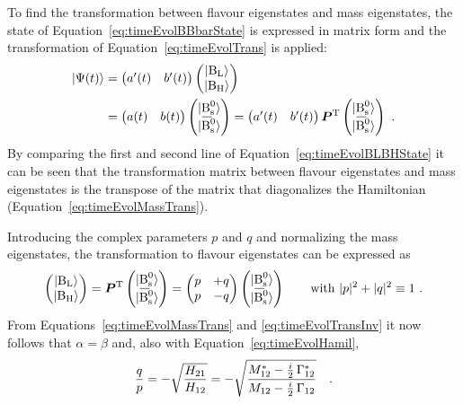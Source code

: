 To find the transformation between flavour eigenstates and mass eigenstates, the state of Equation~\ref{eq:timeEvolBBbarState} is expressed
in matrix form and the transformation of Equation~\ref{eq:timeEvolTrans} is applied:
\begin{equation}
  \label{eq:timeEvolBLBHState}
  \begin{split}
    |\Psi(t)\rangle &= \begin{pmatrix} a'(t) & b'(t) \end{pmatrix} \begin{pmatrix} \BLst \\ \BHst \end{pmatrix} \\
                    &= \begin{pmatrix} a(t) & b(t) \end{pmatrix} \begin{pmatrix} \Bsst \\ \Bsbarst \end{pmatrix}
                     = \begin{pmatrix} a'(t) & b'(t) \end{pmatrix} \vec{P}^\text{T} \begin{pmatrix} \Bsst \\ \Bsbarst \end{pmatrix}
    \ .
  \end{split}
\end{equation}
By comparing the first and second line of Equation~\ref{eq:timeEvolBLBHState} it can be seen that the transformation matrix between flavour
eigenstates and mass eigenstates is the transpose of the matrix that diagonalizes the Hamiltonian (Equation~\ref{eq:timeEvolMassTrans}).

Introducing the complex parameters $p$ and $q$ and normalizing the mass eigenstates, the transformation to flavour eigenstates can be
expressed as
\begin{equation}
  \label{eq:timeEvolTransInv}
  \begin{pmatrix} \BLst \\ \BHst \end{pmatrix}
    = \vec{P}^\text{T} \begin{pmatrix} \Bsst \\ \Bsbarst \end{pmatrix}
    = \begin{pmatrix} p & +q \\ p & -q \end{pmatrix}
      \begin{pmatrix} \Bsst \\ \Bsbarst \end{pmatrix}
  \qquad
  \text{with } |p|^2+|q|^2\equiv1
  \ .
\end{equation}
From Equations~\ref{eq:timeEvolMassTrans} and \ref{eq:timeEvolTransInv} it now follows that $\alpha=\beta$ and, also with
Equation~\ref{eq:timeEvolHamil},
\begin{equation}
  \label{eq:qpDef}
  \frac{q}{p} = -\sqrt{\frac{H_{21}}{H_{12}}} = -\sqrt{\frac{M_\text{12}^*-\tfrac{i}{2}\,\Gamma_\text{12}^*}{M_\text{12}-\tfrac{i}{2}\,\Gamma_\text{12}}}
  \quad .
\end{equation}

